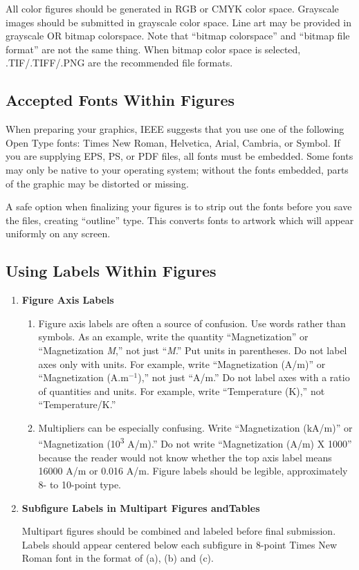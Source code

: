 \documentclass{IEEEtaes}
\begin{document}
All color figures should be generated in RGB or CMYK color space. Grayscale images should be submitted in grayscale color space. Line art may be provided in grayscale OR bitmap colorspace. Note that ``bitmap colorspace'' and ``bitmap file format'' are not the same thing. When bitmap color space is selected, .TIF/.TIFF/.PNG are the recommended file formats.

\subsection{Accepted Fonts Within Figures}

When preparing your graphics, IEEE suggests that you use one of the
following Open Type fonts: Times New Roman, Helvetica, Arial, Cambria,
or Symbol. If you are supplying EPS, PS, or PDF files, all fonts must be
embedded. Some fonts may only be native to your operating system;
without the fonts embedded, parts of the graphic may be distorted or
missing.

A safe option when finalizing your figures is to strip out the fonts
before you save the files, creating ``outline'' type. This converts
fonts to artwork which will appear uniformly on any screen.

\subsection{Using Labels Within Figures}

\begin{enumerate}
\def\labelenumi{\arabic{enumi})}
\item
  \textbf{Figure Axis Labels}

  \begin{enumerate}
  \def\labelenumii{\alph{enumii})}
  \item
    Figure axis labels are often a source of confusion. Use words rather
    than symbols. As an example, write the quantity ``Magnetization'' or
    ``Magnetization \emph{M},'' not just ``\emph{M}.'' Put units in
    parentheses. Do not label axes only with units. For example, write
    ``Magnetization (A/m)'' or ``Magnetization
    (A.m$^{{-}1}$),'' not just ``A/m.'' Do not label axes with
    a ratio of quantities and units. For example, write ``Temperature
    (K),'' not ``Temperature/K.''
  \item
    Multipliers can be especially confusing. Write ``Magnetization
    (kA/m)'' or ``Magnetization (10\textsuperscript{3} A/m).'' Do not
    write ``Magnetization (A/m) X 1000'' because the reader would not
    know whether the top axis label means 16000 A/m or 0.016 A/m. Figure
    labels should be legible, approximately 8- to 10-point type.
  \end{enumerate}
\item
  \textbf{Subfigure Labels in Multipart Figures and\break Tables}

  Multipart figures should be combined and labeled before final submission. Labels should appear centered below each subfigure in 8-point Times New Roman font in the format of (a), (b) and (c).
\end{enumerate}\vspace*{-.5pc} 
\end{document}
